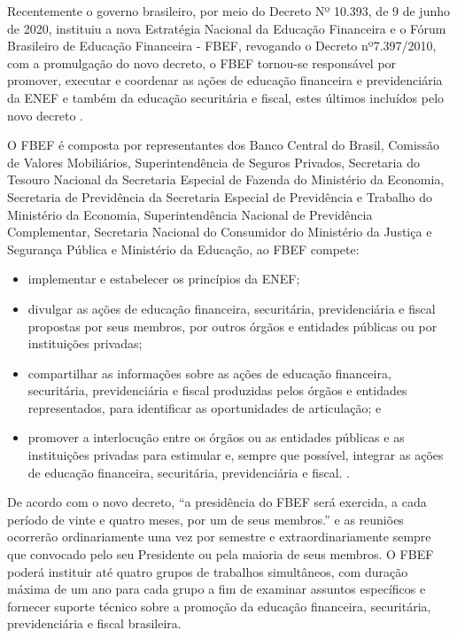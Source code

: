 Recentemente o governo brasileiro, por meio do Decreto Nº 10.393, de 9 de junho de 2020, instituiu a nova Estratégia Nacional da Educação Financeira e o Fórum Brasileiro de Educação Financeira - FBEF, revogando o Decreto nº7.397/2010, com a promulgação do novo decreto, o FBEF tornou-se responsável por promover, executar e coordenar as ações de educação financeira e previdenciária da ENEF e também da educação securitária e fiscal, estes últimos incluídos pelo novo decreto \cite{brasil2020}.

O FBEF é composta por representantes dos Banco Central do Brasil, Comissão de Valores Mobiliários, Superintendência de Seguros Privados, Secretaria do Tesouro Nacional da Secretaria Especial de Fazenda do Ministério da Economia, Secretaria de Previdência da Secretaria Especial de Previdência e Trabalho do Ministério da Economia, Superintendência Nacional de Previdência Complementar, Secretaria Nacional do Consumidor do Ministério da Justiça e Segurança Pública e Ministério da Educação, ao FBEF compete:

\begin{citacao}
    \begin{itemize}
        \item implementar e estabelecer os princípios da ENEF;
        \item divulgar as ações de educação financeira, securitária, previdenciária e fiscal propostas por seus membros, por outros órgãos e entidades públicas ou por instituições privadas;
        \item compartilhar as informações sobre as ações de educação financeira, securitária, previdenciária e fiscal produzidas pelos órgãos e entidades representados, para identificar as oportunidades de articulação; e
        \item promover a interlocução entre os órgãos ou as entidades públicas e as instituições privadas para estimular e, sempre que possível, integrar as ações de educação financeira, securitária, previdenciária e fiscal. \cite{brasil2020}.
    \end{itemize}
\end{citacao}

De acordo com o novo decreto, “a presidência do FBEF será exercida, a cada período de vinte e quatro meses, por um de seus membros.” \cite{brasil2020} e as reuniões ocorrerão ordinariamente uma vez por semestre e extraordinariamente sempre que convocado pelo seu Presidente ou pela maioria de seus membros. O FBEF poderá instituir até quatro grupos de trabalhos simultâneos, com duração máxima de um ano para cada grupo a fim de examinar assuntos específicos e fornecer suporte técnico sobre a promoção da educação financeira, securitária, previdenciária e fiscal brasileira.

